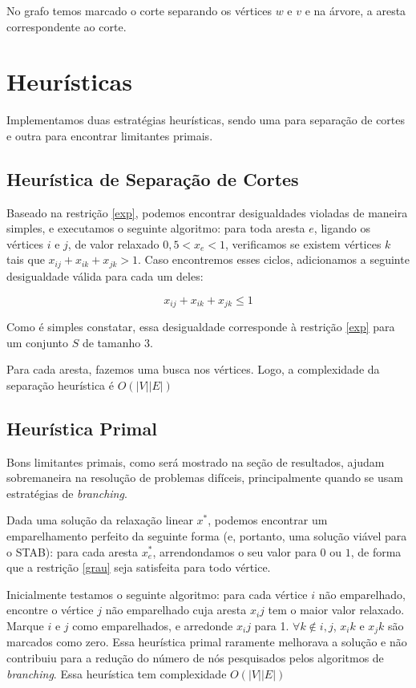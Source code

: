 \documentclass[11pt]{article}
\begin{document}
No grafo temos marcado o corte separando os vértices $w$ e $v$ e na
árvore, a aresta correspondente ao corte.

\section{Heurísticas}

Implementamos duas estratégias heurísticas, sendo uma para separação de
cortes e outra para encontrar limitantes primais. 

\subsection{Heurística de Separação de Cortes}

Baseado na restrição \eqref{exp}, podemos encontrar desigualdades
violadas de maneira simples, e executamos o seguinte algoritmo: para
toda aresta $e$, ligando os vértices $i$ e $j$, de valor relaxado \( 0,5
< x_e < 1 \), verificamos se existem vértices $k$ tais que \( x_{ij} +
x_{ik} + x_{jk} > 1 \). Caso encontremos esses ciclos, adicionamos a
seguinte desigualdade válida para cada um deles: 

\begin{equation}
 x_{ij} + x_{ik} + x_{jk} \leq 1
\end{equation}

Como é simples constatar, essa desigualdade corresponde à restrição
\eqref{exp} para um conjunto $S$ de tamanho $3$. 

Para cada aresta, fazemos uma busca nos vértices. Logo, a complexidade
da separação heurística é $O(|V||E|)$

\subsection{Heurística Primal}

Bons limitantes primais, como será mostrado na seção de resultados,
ajudam sobremaneira na resolução de problemas difíceis, principalmente
quando se usam estratégias de \emph{branching}.

Dada uma solução da relaxação linear $x^*$, podemos encontrar um
emparelhamento perfeito da seguinte forma (e, portanto, uma solução
viável para o STAB): para cada aresta $x^*_e$, arrendondamos o seu valor
para $0$ ou $1$, de forma que a restrição \eqref{grau} seja satisfeita
para todo vértice. 

Inicialmente testamos o seguinte algoritmo: para cada vértice $i$ não
emparelhado, encontre o vértice $j$ não emparelhado cuja aresta $x_ij$
tem o maior valor relaxado. Marque $i$ e $j$ como emparelhados, e
arredonde $x_ij$ para 1. $\forall k \notin {i,j}$, $x_ik$ e $x_jk$ são
marcados como zero. Essa heurística primal raramente melhorava a
solução e não contribuiu para a redução do número de nós pesquisados
pelos algoritmos de \emph{branching}. Essa heurística tem complexidade
$O(|V||E|)$ 
\end{document}
